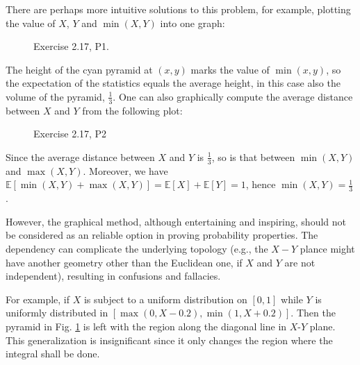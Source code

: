 \documentclass[UTF8]{ctexart}
\begin{document}
There are perhaps more intuitive solutions to this problem, for example, plotting the value of $X$, $Y$ and $\min(X,Y)$ into one graph:
\begin{figure}[htbp]
\centering
{}
\caption{Exercise 2.17, P1.}
\label{figure:2.1}
\end{figure}
The height of the cyan pyramid at $(x,y)$ marks the value of $\min(x,y)$, so the expectation of the statistics equals the average height, in this case also the volume of the pyramid, $\frac{1}{3}$. 
One can also graphically compute the average distance between $X$ and $Y$ from the following plot:
\begin{figure}[htbp]
\centering
{}
\caption{Exercise 2.17, P2}
\end{figure}
Since the average distance between $X$ and $Y$ is $\frac{1}{3}$, so is that between $\min(X,Y)$ and $\max(X,Y)$. 
Moreover, we have $\mathbb{E}[\min(X,Y)+\max(X,Y)]=\mathbb{E}[X]+\mathbb{E}[Y]=1$, hence $\min(X,Y)=\frac{1}{3}$.

However, the graphical method, although entertaining and inspiring, should not be considered as an reliable option in proving probability properties. 
The dependency can complicate the underlying topology (e.g., the $X-Y$ plance might have another geometry other than the Euclidean one, if $X$ and $Y$ are not independent), resulting in confusions and fallacies. 

For example, if $X$ is subject to a uniform distribution on $[0,1]$ while $Y$ is uniformly distributed in $[\max(0,X-0.2),\min(1,X+0.2)]$. 
Then the pyramid in Fig. \ref{figure:2.1} is left with the region along the diagonal line in $X$-$Y$ plane. 
This generalization is insignificant since it only changes the region where the integral shall be done. 
\end{document}
